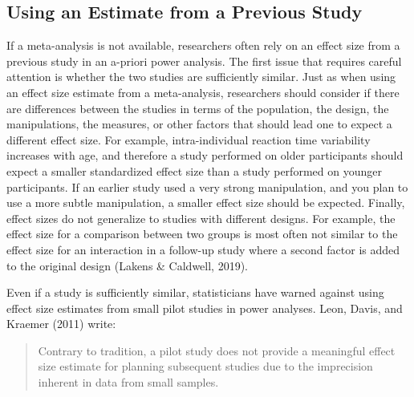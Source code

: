 \documentclass[
  english,
  ,jou, a4paper,floatsintext]{apa6}
\begin{document}
\hypertarget{using-an-estimate-from-a-previous-study}{%
\subsection{Using an Estimate from a Previous Study}\label{using-an-estimate-from-a-previous-study}}

If a meta-analysis is not available, researchers often rely on an effect size from a previous study in an a-priori power analysis. The first issue that requires careful attention is whether the two studies are sufficiently similar. Just as when using an effect size estimate from a meta-analysis, researchers should consider if there are differences between the studies in terms of the population, the design, the manipulations, the measures, or other factors that should lead one to expect a different effect size. For example, intra-individual reaction time variability increases with age, and therefore a study performed on older participants should expect a smaller standardized effect size than a study performed on younger participants. If an earlier study used a very strong manipulation, and you plan to use a more subtle manipulation, a smaller effect size should be expected. Finally, effect sizes do not generalize to studies with different designs. For example, the effect size for a comparison between two groups is most often not similar to the effect size for an interaction in a follow-up study where a second factor is added to the original design (Lakens \& Caldwell, 2019).

Even if a study is sufficiently similar, statisticians have warned against using effect size estimates from small pilot studies in power analyses. Leon, Davis, and Kraemer (2011) write:

\begin{quote}
Contrary to tradition, a pilot study does not provide a meaningful effect size estimate for planning subsequent studies due to the imprecision inherent in data from small samples.
\end{quote}
\end{document}
